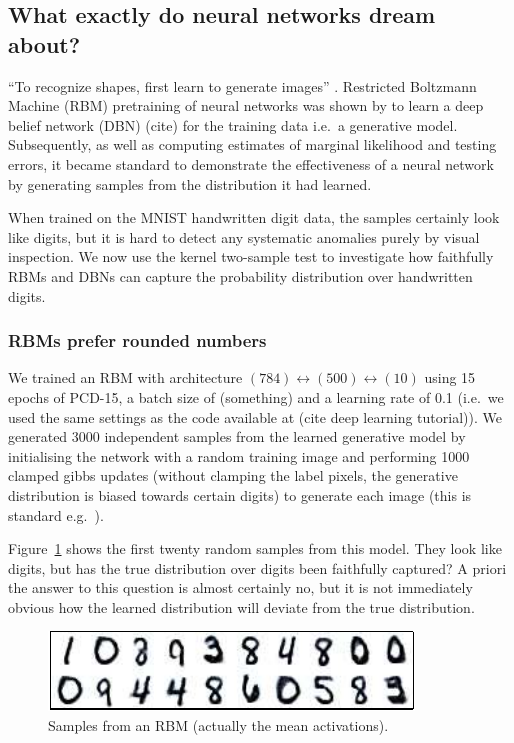 \documentclass{article}
\def\ie{i.e.\ }
\def\eg{e.g.\ }
\begin{document}
\subsection{What exactly do neural networks dream about?}

``To recognize shapes, first learn to generate images'' \cite{Hinton2007}.
Restricted Boltzmann Machine (RBM) pretraining of neural networks was shown by \cite{Hinton2006} to learn a deep belief network (DBN) (cite) for the training data \ie a generative model.
Subsequently, as well as computing estimates of marginal likelihood and testing errors, it became standard to demonstrate the effectiveness of a neural network by generating samples from the distribution it had learned.

When trained on the MNIST handwritten digit data, the samples certainly look like digits, but it is hard to detect any systematic anomalies purely by visual inspection.
We now use the kernel two-sample test to investigate how faithfully RBMs and DBNs can capture the probability distribution over handwritten digits.

\subsubsection{RBMs prefer rounded numbers}

We trained an RBM with architecture $(784)\leftrightarrow(500)\leftrightarrow(10)$ using 15 epochs of PCD-15, a batch size of (something) and a learning rate of 0.1 (\ie we used the same settings as the code available at (cite deep learning tutorial)).
We generated 3000 independent samples from the learned generative model by initialising the network with a random training image and performing 1000 clamped gibbs updates (without clamping the label pixels, the generative distribution is biased towards certain digits) to generate each image (this is standard \eg \cite{Hinton2007}).

Figure~\ref{fig:rbm_samples} shows the first twenty random samples from this model.
They look like digits, but has the true distribution over digits been faithfully captured?
A priori the answer to this question is almost certainly no, but it is not immediately obvious how the learned distribution will deviate from the true distribution.

\begin{figure}[ht]
\centering
\includegraphics[width=0.98\columnwidth]{figures/rbm_samples}
\caption{
Samples from an RBM (actually the mean activations).
}
\label{fig:rbm_samples}
\end{figure}
\end{document}
